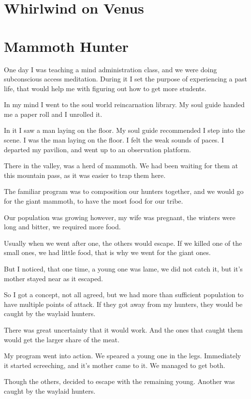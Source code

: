 \chapter{Whirlwind on Venus}
\chapter{Mammoth Hunter}
\label{reincarnation:mammoth}
One day I was teaching a mind administration class, and we were doing 
subconscious access meditation. During it I set the purpose of experiencing a
past life, that would help me with figuring out how to get more students.

In my mind I went to the soul world reincarnation library. My soul guide
handed me a paper roll and I unrolled it.

In it I saw a man laying on the floor. My soul guide recommended I step into
the scene. I was the man laying on the floor. I felt the weak sounds of
paces. I departed my pavilion, and went up to an observation platform.

There in the valley, was a herd of mammoth. We had been waiting for them at this
mountain pass, as it was easier to trap them here. 

The familiar program was to composition our hunters together, and we would go for
the giant mammoth, to have the most food for our tribe. 

Our population was growing however, my wife was pregnant, the winters were long
 and bitter, we required more food.

Usually when we went after one, the others would escape. 
If we killed one of the small ones, we had little food,
that is why we went for the giant ones. 

But I noticed, that one time, a young one was lame, we did not catch it, but
it's mother stayed near as it escaped. 

So I got a concept, not all agreed, but we had more than sufficient population 
to have multiple points of attack. If they got away from my hunters, they would 
be caught by the waylaid hunters. 

There was great uncertainty that it would work. And the ones that caught them
would get the larger share of the meat. 

My program went into action. We speared a young one in the legs.
Immediately it started screeching, and it's mother came to it. 
We managed to get both.

Though the others, decided to escape with the remaining young. Another was
caught by the waylaid hunters.

